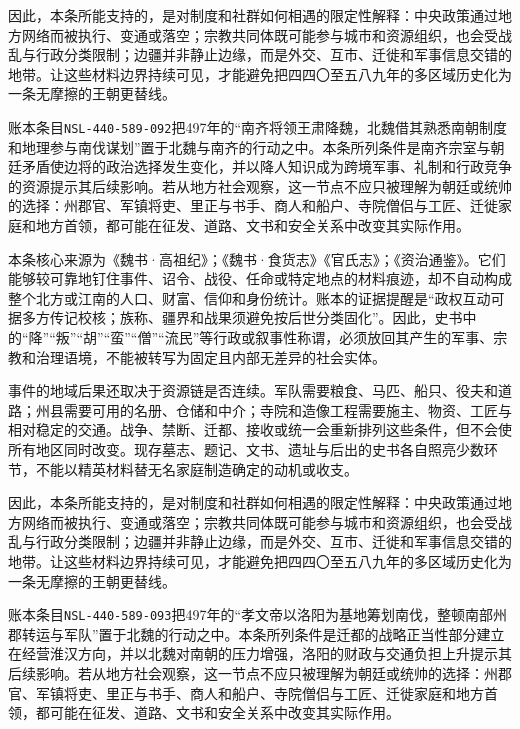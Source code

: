 因此，本条所能支持的，是对制度和社群如何相遇的限定性解释：中央政策通过地方网络而被执行、变通或落空；宗教共同体既可能参与城市和资源组织，也会受战乱与行政分类限制；边疆并非静止边缘，而是外交、互市、迁徙和军事信息交错的地带。让这些材料边界持续可见，才能避免把四四〇至五八九年的多区域历史化为一条无摩擦的王朝更替线。

账本条目\texttt{NSL-440-589-092}把497年的“南齐将领王肃降魏，北魏借其熟悉南朝制度和地理参与南伐谋划”置于北魏与南齐的行动之中。本条所列条件是南齐宗室与朝廷矛盾使边将的政治选择发生变化，并以降人知识成为跨境军事、礼制和行政竞争的资源提示其后续影响。若从地方社会观察，这一节点不应只被理解为朝廷或统帅的选择：州郡官、军镇将吏、里正与书手、商人和船户、寺院僧侣与工匠、迁徙家庭和地方首领，都可能在征发、道路、文书和安全关系中改变其实际作用。

本条核心来源为《魏书·高祖纪》；《魏书·食货志》《官氏志》；《资治通鉴》。它们能够较可靠地钉住事件、诏令、战役、任命或特定地点的材料痕迹，却不自动构成整个北方或江南的人口、财富、信仰和身份统计。账本的证据提醒是“政权互动可据多方传记校核；族称、疆界和战果须避免按后世分类固化”。因此，史书中的“降”“叛”“胡”“蛮”“僧”“流民”等行政或叙事性称谓，必须放回其产生的军事、宗教和治理语境，不能被转写为固定且内部无差异的社会实体。

事件的地域后果还取决于资源链是否连续。军队需要粮食、马匹、船只、役夫和道路；州县需要可用的名册、仓储和中介；寺院和造像工程需要施主、物资、工匠与相对稳定的交通。战争、禁断、迁都、接收或统一会重新排列这些条件，但不会使所有地区同时改变。现存墓志、题记、文书、遗址与后出的史书各自照亮少数环节，不能以精英材料替无名家庭制造确定的动机或收支。

因此，本条所能支持的，是对制度和社群如何相遇的限定性解释：中央政策通过地方网络而被执行、变通或落空；宗教共同体既可能参与城市和资源组织，也会受战乱与行政分类限制；边疆并非静止边缘，而是外交、互市、迁徙和军事信息交错的地带。让这些材料边界持续可见，才能避免把四四〇至五八九年的多区域历史化为一条无摩擦的王朝更替线。

账本条目\texttt{NSL-440-589-093}把497年的“孝文帝以洛阳为基地筹划南伐，整顿南部州郡转运与军队”置于北魏的行动之中。本条所列条件是迁都的战略正当性部分建立在经营淮汉方向，并以北魏对南朝的压力增强，洛阳的财政与交通负担上升提示其后续影响。若从地方社会观察，这一节点不应只被理解为朝廷或统帅的选择：州郡官、军镇将吏、里正与书手、商人和船户、寺院僧侣与工匠、迁徙家庭和地方首领，都可能在征发、道路、文书和安全关系中改变其实际作用。


